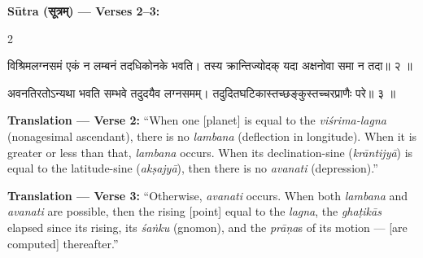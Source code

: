 \documentclass[11pt,a4paper]{article}
\newcommand{\dev}[1]{{\devanagarifont #1}}
\newenvironment{sanskritverse}{%
  \begin{center}\begin{minipage}{0.95\textwidth}
  \setlength{\leftskip}{1em}
  \setlength{\rightskip}{1em}
  \dev
}{\end{minipage}\end{center}}
\begin{document}
\vspace{0.5em}
\noindent\textbf{Sūtra (\dev{सूत्रम्}) — Verses 2--3:}

\begin{paracol}{2}

\begin{sanskritverse}
विश्रिमलग्नसमं एकं न लम्बनं तदधिकोनके भवति।
तस्य क्रान्तिज्योदक् यदा अक्षनोवा समा न तदा॥ २ ॥
\end{sanskritverse}

\begin{sanskritverse}
अवनतिरतोऽन्यथा भवति सम्भवे तदुदयैव लग्नसमम्।
तदुदितघटिकास्तच्छङ्कुस्तच्चरप्राणैः परे॥ ३ ॥
\end{sanskritverse}

\switchcolumn

\textbf{Translation — Verse 2:} ``When one [planet] is equal to the \textit{viśrima-lagna} (nonagesimal ascendant), there is no \textit{lambana} (deflection in longitude). When it is greater or less than that, \textit{lambana} occurs. When its declination-sine (\textit{krāntijyā}) is equal to the latitude-sine (\textit{akṣajyā}), then there is no \textit{avanati} (depression).''

\textbf{Translation — Verse 3:} ``Otherwise, \textit{avanati} occurs. When both \textit{lambana} and \textit{avanati} are possible, then the rising [point] equal to the \textit{lagna}, the \textit{ghaṭikās} elapsed since its rising, its \textit{śaṅku} (gnomon), and the \textit{prāṇa}s of its motion --- [are computed] thereafter.''

\end{paracol}

\vspace{0.5em}
\end{document}
